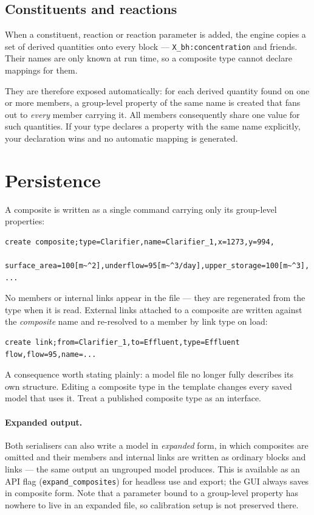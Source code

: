 \documentclass[11pt,a4paper]{article}
\newcommand{\code}[1]{\texttt{\small #1}}
\begin{document}
\subsection{Constituents and reactions}\label{sec:constituents}

When a constituent, reaction or reaction parameter is added, the engine copies
a set of derived quantities onto every block --- \code{X\_bh:concentration} and
friends. Their names are only known at run time, so a composite type cannot
declare mappings for them.

They are therefore exposed automatically: for each derived quantity found on
one or more members, a group-level property of the same name is created that
fans out to \emph{every} member carrying it. All members consequently share one
value for such quantities. If your type declares a property with the same name
explicitly, your declaration wins and no automatic mapping is generated.

\section{Persistence}

A composite is written as a single command carrying only its group-level
properties:

\begin{lstlisting}[style=plain]
create composite;type=Clarifier,name=Clarifier_1,x=1273,y=994,
    surface_area=100[m~^2],underflow=95[m~^3/day],upper_storage=100[m~^3], ...
\end{lstlisting}

\noindent
No members or internal links appear in the file --- they are regenerated from
the type when it is read. External links attached to a composite are written
against the \emph{composite} name and re-resolved to a member by link type on
load:

\begin{lstlisting}[style=plain]
create link;from=Clarifier_1,to=Effluent,type=Effluent flow,flow=95,name=...
\end{lstlisting}

\noindent
A consequence worth stating plainly: a model file no longer fully describes its
own structure. Editing a composite type in the template changes every saved
model that uses it. Treat a published composite type as an interface.

\paragraph{Expanded output.}
Both serialisers can also write a model in \emph{expanded} form, in which
composites are omitted and their members and internal links are written as
ordinary blocks and links --- the same output an ungrouped model produces. This
is available as an API flag (\code{expand\_composites}) for headless use and
export; the GUI always saves in composite form. Note that a parameter bound to
a group-level property has nowhere to live in an expanded file, so calibration
setup is not preserved there.
\end{document}
